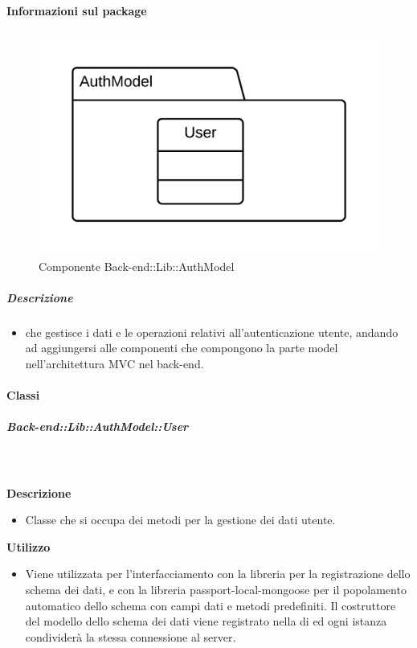  \paragraph{Informazioni sul package} 
    \begin{figure}[H] 
      \begin{center} 
        \includegraphics[width=\textwidth]{packages/Back-end::Lib::AuthModel.png}  
        \caption{Componente Back-end::Lib::AuthModel}
      \end{center}  
    \end{figure} 
  \subparagraph{Descrizione} 
    \begin{itemize}
    \item[]  che gestisce i dati e le operazioni relativi all'autenticazione utente, andando ad aggiungersi alle componenti che compongono la parte model nell'architettura MVC nel back-end. 
    \end{itemize} 
    \paragraph{Classi}
      \subparagraph{Back-end::Lib::AuthModel::User}
        
        \textbf{\\ \\ Descrizione} 
          \begin{itemize}
            \item[] Classe che si occupa dei metodi per la gestione dei dati utente. 
          \end{itemize}      
        \textbf{Utilizzo}  
          \begin{itemize}
            \item[] Viene utilizzata per l'interfacciamento con la libreria  per la registrazione dello schema dei dati, e con la libreria passport-local-mongoose per il popolamento automatico dello schema con campi dati e metodi predefiniti.
Il costruttore del modello dello schema dei dati viene registrato nella  di  ed ogni istanza condividerà la stessa connessione al server.
          \end{itemize}
